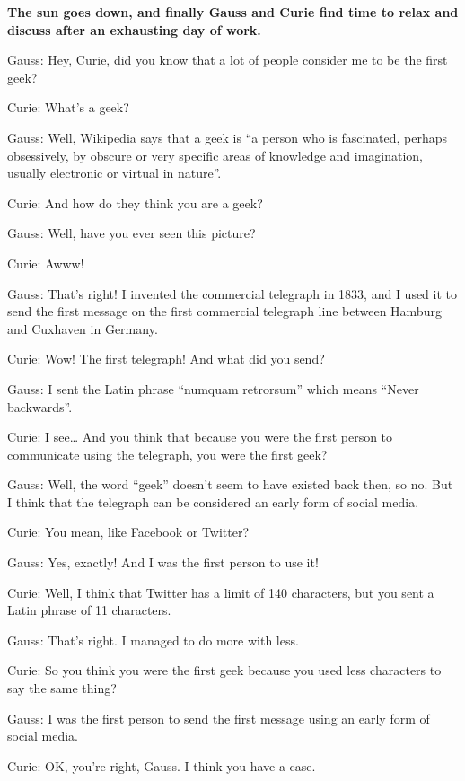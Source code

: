 \documentclass[11pt]{article}
\begin{document}
\newpage
\begin{framed}
\centering
\vspace{.5em}
\begin{minipage}{.9\textwidth}
\textbf{The sun goes down, and finally Gauss and Curie find time to relax and discuss after an exhausting day of work.}

Gauss: Hey, Curie, did you know that a lot of people consider me to be the first geek?

Curie: What’s a geek?

Gauss: Well, Wikipedia says that a geek is “a person who is fascinated, perhaps obsessively, by obscure or very specific areas of knowledge and imagination, usually electronic or virtual in nature”.

Curie: And how do they think you are a geek?

Gauss: Well, have you ever seen this picture?

Curie: Awww!

Gauss: That’s right! I invented the commercial telegraph in 1833, and I used it to send the first message on the first commercial telegraph line between Hamburg and Cuxhaven in Germany.

Curie: Wow! The first telegraph! And what did you send?

Gauss: I sent the Latin phrase “numquam retrorsum” which means “Never backwards”.

Curie: I see… And you think that because you were the first person to communicate using the telegraph, you were the first geek?

Gauss: Well, the word “geek” doesn’t seem to have existed back then, so no. But I think that the telegraph can be considered an early form of social media.

Curie: You mean, like Facebook or Twitter?

Gauss: Yes, exactly! And I was the first person to use it!

Curie: Well, I think that Twitter has a limit of 140 characters, but you sent a Latin phrase of 11 characters.

Gauss: That’s right. I managed to do more with less.

Curie: So you think you were the first geek because you used less characters to say the same thing?

Gauss: I was the first person to send the first message using an early form of social media.

Curie: OK, you’re right, Gauss. I think you have a case.
\end{minipage}
\vspace{.5em}
\end{framed}
\end{document}
